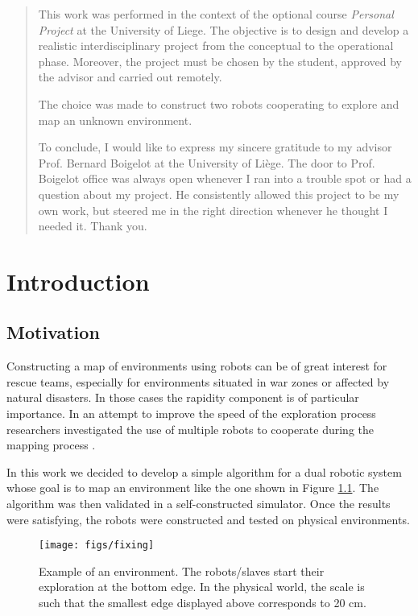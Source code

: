 \documentclass[12pt]{report}
\begin{document}
\renewcommand{\abstractname}{Foreword}
\begin{abstract}
This work was performed in the context of the optional course \textit{Personal Project} at the University of Liege. The objective is to design and develop a realistic interdisciplinary project from the conceptual to the operational phase. Moreover, the project must be chosen by the student, approved by the advisor and carried out remotely. 

The choice was made to construct two robots cooperating to explore and map an unknown environment.

To conclude, I would like to express my sincere gratitude to my advisor Prof. Bernard Boigelot at the University of Liège. The door to Prof. Boigelot office was always open whenever I ran into a trouble spot or had a question about my project. He consistently allowed this project to be my own work, but steered me in the right direction whenever he thought I needed it. Thank you.
\end{abstract}
\tableofcontents
\clearpage
{}
\chapter{Introduction}
\section{Motivation}
Constructing a map of environments using robots can be of great interest for rescue teams, especially for environments situated in war zones or affected by natural disasters. In those cases the rapidity component is of particular importance. In an attempt to improve the speed of the exploration process researchers investigated the use of multiple robots to cooperate during the mapping process \cite{burgard, kurt}.

In this work we decided to develop a simple algorithm for a dual robotic system whose goal is to map an environment like the one shown in Figure \ref{fig:env}. The algorithm was then validated in a self-constructed simulator. Once the results were satisfying, the robots were constructed and tested on physical environments.

\begin{figure}[!h]
\vspace*{4mm}
\centering
\texttt{[image: figs/fixing]}
\caption{Example of an environment. The robots/slaves start their exploration at the bottom edge. In the physical world, the scale is such that the smallest edge displayed above corresponds to 20 cm.}
\label{fig:env}
\end{figure}
\end{document}
